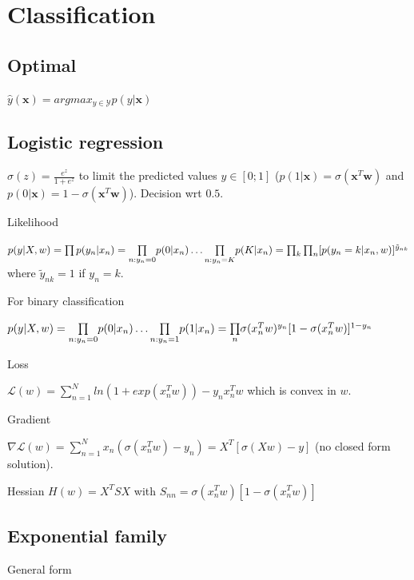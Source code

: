 \section{Classification}
\subsection{Optimal}
$\hat{y}(\mathbf{x}) = argmax_{y\in \mathcal{Y}} p(y|\mathbf{x})$

\subsection{Logistic regression}
$\sigma(z) = \frac{e^z}{1+e^z}$ to limit the predicted values $y\in [0;1]$ ($p(1|\mathbf{x}) = \sigma(\mathbf{x}^T\mathbf{w})$ and $p(0|\mathbf{x}) = 1-\sigma(\mathbf{x}^T\mathbf{w})$). Decision wrt $0.5$.

Likelihood

$p(y | X,w) = \prod p(y_n|x_n) \newline =\underset{n:y_n=0}{\prod} p(0|x_n) \dots \underset{n:y_n=K}{\prod} p(K|x_n) \newline = \prod_k \prod_n [p(y_n = k | x_n,w)]^{\tilde{y}_{nk}}$ \newline where ${\tilde{y}_{nk}} = 1$ if $y_n=k$.

For binary classification

$p(y | X, w) = \underset{n:y_n=0}{\prod} p(0|x_n) \dots\underset{n:y_n=1}{\prod} p(1|x_n) \newline = \underset{n}{\prod} \sigma({x_n^T w})^{y_n}[1-\sigma({x_n^T w})]^{1-y_n}$

Loss

$\mathcal{L}(w) = \sum_{n=1}^N ln(1 + exp(x_n^T w)) - y_n x_n^T w$ which is convex in $w$.

Gradient

$\nabla \mathcal{L}(w) = \sum_{n=1}^N x_n (\sigma(x_n^T w) - y_n) = X^T[\sigma(Xw) - y]$ (no closed form solution).

Hessian $H(w) = X^T S X$ \newline with $S_{nn} = \sigma(x_n^T w)[1-\sigma(x_n^T w)]$

\subsection{Exponential family}
General form

